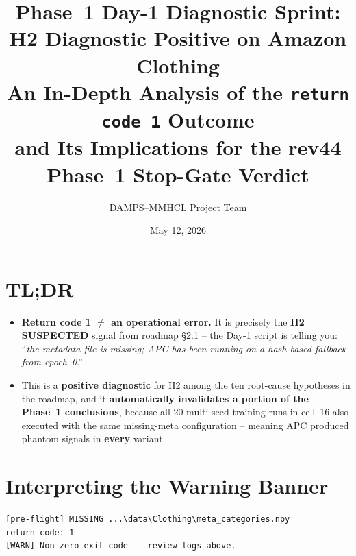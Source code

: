 \documentclass[11pt,a4paper]{article}
\title{\textbf{Phase~1 Day-1 Diagnostic Sprint: \\
H2 Diagnostic Positive on Amazon Clothing} \\[0.3em]
\large An In-Depth Analysis of the \texttt{return code 1} Outcome \\
\large and Its Implications for the rev44 Phase~1 Stop-Gate Verdict}
\author{DAMPS--MMHCL Project Team}
\date{May 12, 2026}
\begin{document}
\maketitle

\begin{center}
\end{center}

\section{TL;DR}

\begin{itemize}[leftmargin=*]
  \item \textbf{Return code 1 $\neq$ an operational error.} It is precisely the
        \textbf{H2 SUSPECTED} signal from roadmap §2.1 -- the Day-1 script is
        telling you: ``\textit{the metadata file is missing; APC has been
        running on a hash-based fallback from epoch~0}.''
  \item This is a \textbf{positive diagnostic} for H2 among the ten root-cause
        hypotheses in the roadmap, and it \textbf{automatically invalidates a
        portion of the Phase~1 conclusions}, because all 20 multi-seed training
        runs in cell~16 also executed with the same missing-meta configuration --
        meaning APC produced phantom signals in \textbf{every} variant.
\end{itemize}

\section{Interpreting the Warning Banner}

\begin{lstlisting}
[pre-flight] MISSING ...\data\Clothing\meta_categories.npy
return code: 1
[WARN] Non-zero exit code -- review logs above.
\end{lstlisting}
\end{document}
